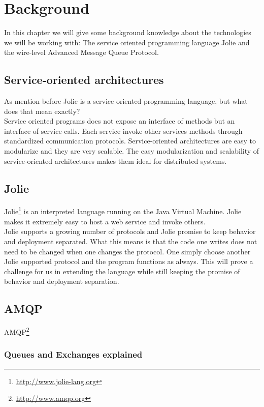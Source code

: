 \section{Background}
In this chapter we will give some background knowledge about the technologies we will be working with: The service oriented programming language Jolie and the wire-level Advanced Message Queue Protocol.
\subsection{Service-oriented architectures}
As mention before Jolie is a service oriented programming language, but what does that mean exactly?\\
Service oriented programs does not expose an interface of methods but an interface of service-calls. Each service invoke other services methods through standardized communication protocols. Service-oriented architectures are easy to modularize and they are very scalable. The easy modularization and scalability of service-oriented architectures makes them ideal for distributed systems.
\subsection{Jolie}
Jolie\footnote{\url{http://www.jolie-lang.org}} is an interpreted language running on the Java Virtual Machine. Jolie makes it extremely easy to host a web service and invoke others.\\
Jolie supports a growing number of protocols and Jolie promise to keep behavior and deployment separated. What this means is that the code one writes does not need to be changed when one changes the protocol. One simply choose another Jolie supported protocol and the program functions as always. This will prove a challenge for us in extending the language while still keeping the promise of behavior and deployment separation.
\subsection{AMQP}
AMQP\footnote{\url{http://www.amqp.org}}
\subsubsection{Queues and Exchanges explained}
\newpage